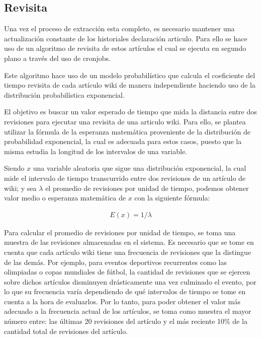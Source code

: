\subsection{Revisita}

Una vez el proceso de extracción esta completo,
es necesario mantener una actualización constante de los historiales declaración articulo.
Para ello se hace uso de un algoritmo de revisita de estos artículos
el cual se ejecuta en segundo plano a través del uso de cronjobs.

Este algoritmo hace uso de un modelo probabilístico que calcula el coeficiente del tiempo revisita de cada artículo wiki de manera independiente haciendo uso de la distribución probabilística exponencial.

El objetivo es buscar un valor esperado de tiempo que mida la distancia entre dos revisiones para ejecutar una revisita de una articulo wiki.
Para ello, se plantea utilizar la fórmula de la esperanza matemática proveniente de la distribución de probabilidad exponencial, la cual es adecuada para estos casos, puesto que la misma estudia la longitud de los intervalos de una variable.

Siendo $x$  una variable aleatoria que sigue una distribución exponencial, la cual mide el intervalo de tiempo transcurrido entre dos revisiones de un artículo de wiki;
y sea $\lambda$ el promedio de revisiones por unidad de tiempo, podemos obtener valor medio o esperanza  matemática de $x$ con la siguiente fórmula:

\begin{gather*}
E(x) = 1 / \lambda
\end{gather*}

Para calcular el promedio de revisiones por unidad de tiempo, se toma una muestra de las revisiones almacenadas en el sistema.
Es necesario que se tome en cuenta que cada artículo wiki tiene una frecuencia de revisiones que la distingue de las demás.
Por ejemplo, para eventos deportivos recurrentes como las olimpiadas o copas mundiales de fútbol, la cantidad de revisiones que se ejercen sobre dichos artículos disminuyen drásticamente una vez culminado el evento, por lo que su frecuencia varía dependiendo de qué intervalos de tiempo se tome en cuenta a la hora de evaluarlos.
Por lo tanto, para poder obtener el valor más adecuado a la frecuencia actual de los artículos, se toma como muestra el mayor número entre: las últimas 20 revisiones del artículo y el más reciente 10\% de la cantidad total de revisiones del artículo.

